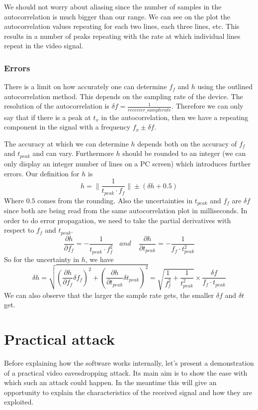 \documentclass[a4paper,12pt,twoside,openright]{report}
\begin{document}
We should not worry about aliasing since the number of samples in the autocorrelation is much bigger than our range. We can see on the plot the autocorrelation values repeating for each two lines, each three lines, etc. This results in a number of peaks repeating with the rate at which individual lines repeat in the video signal.

\subsection{Errors}

There is a limit on how accurately one can determine $f_{f}$ and $h$ using the outlined autocorrelation method. This depends on the sampling rate of the device. The resolution of the autocorrelation is $\delta f = \frac{1}{receiver\_samplerate}$. Therefore we can only say that if there is a peak at $t_{x}$ in the autocorrelation, then we have a repeating component in the signal with a frequency $f_{x} \pm \delta f$.

The accuracy at which we can determine $h$ depends both on the accuracy of $f_{f}$ and $t_{peak}$ and can vary. Furthermore $h$ should be rounded to an integer (we can only display an integer number of lines on a PC screen) which introduces further errors. Our definition for $h$ is
$$h = \| \frac{1}{t_{peak} \cdot f_{f}} \| \pm (\delta h + 0.5)$$
Where $0.5$ comes from the rounding. Also the uncertainties in $t_{peak}$ and $f_{f}$ are $\delta f$ since both are being read from the same autocorrelation plot in milliseconds. In order to do error propagation, we need to take the partial derivatives with respect to $f_{f}$ and $t_{peak}$.
$$\frac{\partial h}{\partial f_{f}} = - \frac{1}{t_{peak} \cdot f_{f}^2}
 \,\,\,\,\ and \,\,\,\,\ \
\frac{\partial h}{\partial t_{peak}} = - \frac{1}{f_{f} \cdot t_{peak}^2}$$
So for the uncertainty in $h$, we have
$$\delta h =
\sqrt{\left( \frac{\partial h}{\partial f_{f}} \delta f_{f} \right)^2 + \left( \frac{\partial h}{\partial t_{peak}} \delta t_{peak} \right)^2} = 
\sqrt{\frac{1}{f_{f}^2} + \frac{1}{t_{peak}^2}} \times \frac{\delta f}{f_{f} \cdot t_{peak}}$$
We can also observe that the larger the sample rate gets, the smaller $\delta f$ and $\delta t$ get.

\chapter{Practical attack} 

Before explaining how the software works internally, let's present a demonstration of a practical video eavesdropping attack. Its main aim is to show the ease with which such an attack could happen. In the meantime this will give an opportunity to explain the characteristics of the received signal and how they are exploited.
\end{document}
